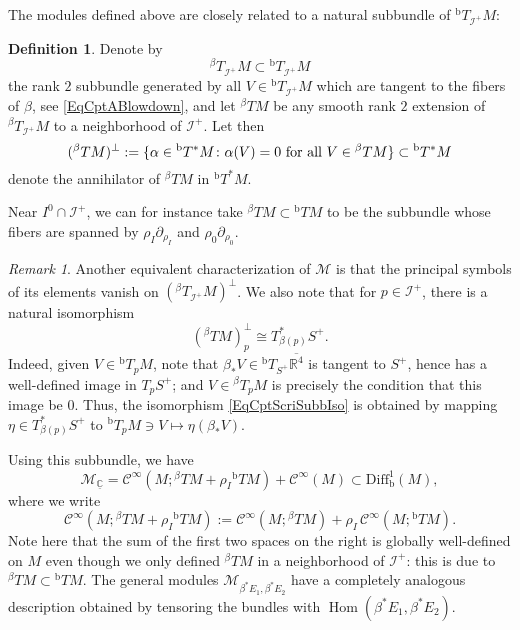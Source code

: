 \documentclass[reqno,11pt,letterpaper]{amsart}
\numberwithin{equation}{section}
\numberwithin{figure}{section}
\theoremstyle{definition}
\newtheorem{definition}[thm]{Definition}
\theoremstyle{remark}
\newtheorem{rmk}[thm]{Remark}
\newcommand{\mc}{\mathcal}
\newcommand{\cC}{\mc C}
\newcommand{\cM}{\mc M}
\newcommand{\ms}{\mathscr}
\newcommand{\scri}{\ms I}
\newcommand{\C}{\mathbb{C}}
\newcommand{\R}{\mathbb{R}}
\newcommand{\Hom}{\operatorname{Hom}}
\newcommand{\ol}{\overline}
\newcommand{\pa}{\partial}
\newcommand{\tn}{\textnormal}
\newcommand{\ul}[1]{\underline{#1}{}}
\newcommand{\bop}{{\mathrm{b}}}
\newcommand{\Diff}{\mathrm{Diff}}
\newcommand{\Diffb}{\Diff_\bop}
\newcommand{\Tb}{{}^{\bop}T}
\newcommand{\Tbeta}{{}^{\beta}T}
\newcommand{\CI}{\cC^\infty}
\begin{document}
The modules defined above are closely related to a natural subbundle of $\Tb_{\scri^+}M$:

\begin{definition}
\label{DefCptScriSubb}
  Denote by
  \[
    \Tbeta_{\scri^+}M\subset\Tb_{\scri^+}M
  \]
  the rank $2$ subbundle generated by all $V\in\Tb_{\scri^+}M$ which are tangent to the fibers of $\beta$, see \eqref{EqCptABlowdown}, and let $\Tbeta M$ be any smooth rank $2$ extension of $\Tbeta_{\scri^+}M$ to a neighborhood of $\scri^+$. Let then
  \[
    (\Tbeta M)^\perp := \{ \alpha\in\Tb^* M \colon \alpha(V)=0\ \tn{for all}\ V\in\Tbeta M \} \subset \Tb^*M
  \]
  denote the annihilator of $\Tbeta M$ in $\Tb^*M$.
\end{definition}

Near $I^0\cap\scri^+$, we can for instance take $\Tbeta M\subset\Tb M$ to be the subbundle whose fibers are spanned by $\rho_I\pa_{\rho_I}$ and $\rho_0\pa_{\rho_0}$.

\begin{rmk}
  Another equivalent characterization of $\cM$ is that the principal symbols of its elements vanish on $(\Tbeta_{\scri^+}M)^\perp$. We also note that for $p\in\scri^+$, there is a natural isomorphism
  \begin{equation}
  \label{EqCptScriSubbIso}
    (\Tbeta M)^\perp_p \cong T^*_{\beta(p)}S^+.
  \end{equation}
  Indeed, given $V\in\Tb_p M$, note that $\beta_*V\in\Tb_{S^+}\ol{\R^4}$ is tangent to $S^+$, hence has a well-defined image in $T_p S^+$; and $V\in\Tbeta_p M$ is precisely the condition that this image be $0$. Thus, the isomorphism \eqref{EqCptScriSubbIso} is obtained by mapping $\eta\in T^*_{\beta(p)}S^+$ to $\Tb_p M\ni V\mapsto\eta(\beta_*V)$.
\end{rmk}

Using this subbundle, we have
\[
  \cM_{\ul\C} = \CI(M;\Tbeta M+\rho_I\Tb M) + \CI(M) \subset \Diffb^1(M),
\]
where we write
\begin{equation}
\label{EqCptScriSections}
  \CI(M;\Tbeta M+\rho_I\Tb M) := \CI(M;\Tbeta M) + \rho_I\,\CI(M;\Tb M).
\end{equation}
Note here that the sum of the first two spaces on the right is globally well-defined on $M$ even though we only defined $\Tbeta M$ in a neighborhood of $\scri^+$: this is due to $\Tbeta M\subset\Tb M$. The general modules $\cM_{\beta^*E_1,\beta^*E_2}$ have a completely analogous description obtained by tensoring the bundles with $\Hom(\beta^*E_1,\beta^*E_2)$.
\end{document}

